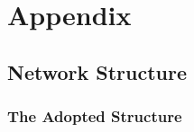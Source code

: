 \documentclass{article} %
\begin{document}
%
%	


\small

\normalsize

\newpage

\section*{Appendix}

\subsection{Network Structure}

\subsubsection{The Adopted Structure}
\end{document}
